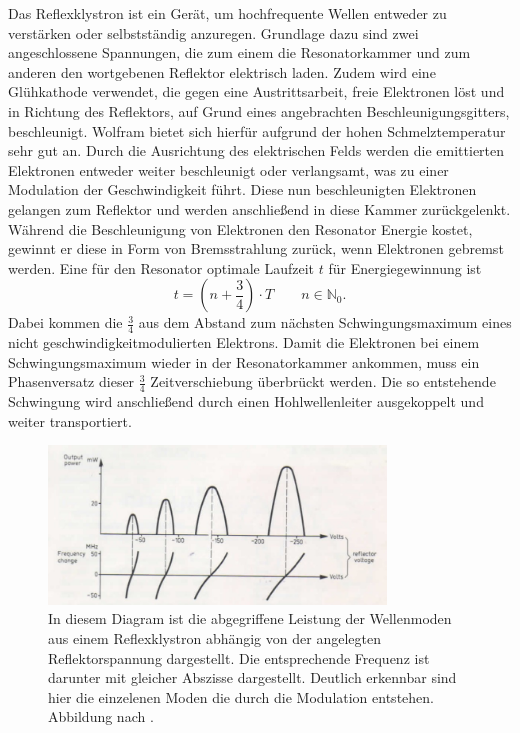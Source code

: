 Das Reflexklystron ist ein Gerät, um hochfrequente Wellen entweder zu verstärken oder selbstständig anzuregen. Grundlage dazu sind zwei angeschlossene Spannungen, 
die zum einem die Resonatorkammer und zum anderen den wortgebenen Reflektor elektrisch laden. Zudem wird eine Glühkathode verwendet, die  
gegen eine Austrittsarbeit, freie Elektronen löst und in Richtung des Reflektors, auf Grund eines angebrachten Beschleunigungsgitters, beschleunigt. Wolfram bietet sich hierfür aufgrund der hohen Schmelztemperatur sehr gut an.
Durch die Ausrichtung des elektrischen Felds werden die emittierten Elektronen entweder weiter beschleunigt oder 
verlangsamt, was zu einer Modulation der Geschwindigkeit führt. Diese nun beschleunigten Elektronen gelangen zum Reflektor und werden anschließend in diese Kammer zurückgelenkt. 
Während die Beschleunigung von Elektronen den Resonator Energie kostet, gewinnt er diese in Form von Bremsstrahlung zurück, wenn Elektronen gebremst werden. 
Eine für den Resonator optimale Laufzeit $t$ für Energiegewinnung ist 
\begin{equation}
    \label{eqn:trash}
    t = \left(n+ \frac{3}{4} \right) \cdot T  \quad \quad n \in \mathbb{N}_0.
\end{equation}
Dabei kommen die $\frac{3}{4}$ aus dem Abstand zum nächsten Schwingungsmaximum eines nicht geschwindigkeitmodulierten Elektrons. Damit die Elektronen bei einem Schwingungsmaximum wieder 
in der Resonatorkammer ankommen, muss ein Phasenversatz dieser $\frac{3}{4}$ Zeitverschiebung überbrückt werden.
Die so entstehende Schwingung wird anschließend durch einen Hohlwellenleiter ausgekoppelt und weiter transportiert.
\begin{figure}
    \centering
    \includegraphics[width=0.8\textwidth]{Bilder/dia.jpg}
    \caption{In diesem Diagram ist die abgegriffene Leistung der Wellenmoden aus einem Reflexklystron abhängig von der angelegten Reflektorspannung dargestellt.
    Die entsprechende Frequenz ist darunter mit gleicher Abszisse dargestellt. Deutlich erkennbar sind hier die einzelenen Moden die durch die Modulation entstehen. Abbildung nach \cite{skript}.} 
    \label{fig:ref}
\end{figure}
